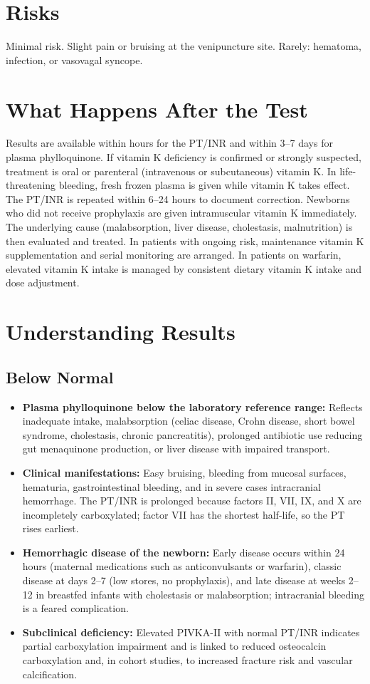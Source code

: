 \section*{Risks}
Minimal risk. Slight pain or bruising at the venipuncture site. Rarely: hematoma, infection, or vasovagal syncope.

\section*{What Happens After the Test}
Results are available within hours for the PT/INR and within 3--7 days for plasma phylloquinone. If vitamin K deficiency is confirmed or strongly suspected, treatment is oral or parenteral (intravenous or subcutaneous) vitamin K. In life-threatening bleeding, fresh frozen plasma is given while vitamin K takes effect. The PT/INR is repeated within 6--24 hours to document correction. Newborns who did not receive prophylaxis are given intramuscular vitamin K immediately. The underlying cause (malabsorption, liver disease, cholestasis, malnutrition) is then evaluated and treated. In patients with ongoing risk, maintenance vitamin K supplementation and serial monitoring are arranged. In patients on warfarin, elevated vitamin K intake is managed by consistent dietary vitamin K intake and dose adjustment.

\section*{Understanding Results}

\subsection*{Below Normal}
\begin{itemize}
  \item \textbf{Plasma phylloquinone below the laboratory reference range:} Reflects inadequate intake, malabsorption (celiac disease, Crohn disease, short bowel syndrome, cholestasis, chronic pancreatitis), prolonged antibiotic use reducing gut menaquinone production, or liver disease with impaired transport.
  \item \textbf{Clinical manifestations:} Easy bruising, bleeding from mucosal surfaces, hematuria, gastrointestinal bleeding, and in severe cases intracranial hemorrhage. The PT/INR is prolonged because factors II, VII, IX, and X are incompletely carboxylated; factor VII has the shortest half-life, so the PT rises earliest.
  \item \textbf{Hemorrhagic disease of the newborn:} Early disease occurs within 24 hours (maternal medications such as anticonvulsants or warfarin), classic disease at days 2--7 (low stores, no prophylaxis), and late disease at weeks 2--12 in breastfed infants with cholestasis or malabsorption; intracranial bleeding is a feared complication.
  \item \textbf{Subclinical deficiency:} Elevated PIVKA-II with normal PT/INR indicates partial carboxylation impairment and is linked to reduced osteocalcin carboxylation and, in cohort studies, to increased fracture risk and vascular calcification.
\end{itemize}

